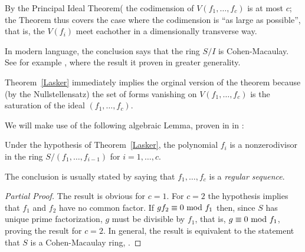 \documentclass[12pt, leqno]{book}
\begin{document}
By the Principal Ideal Theorem(\cite[Theorem ***]{Eisenbud95} the codimension of $V(f_{1},\dots, f_{c})$ is at most $c$;
the Theorem thus covers the case where the codimension is ``as large as possible'', that is, the $V(f_{i})$ meet eachother
in a dimensionally transverse way.

In modern language, the conclusion says that the ring $S/I$ is Cohen-Macaulay. See for example \cite[Chapter 18]{Eisenbud95}, where the result it proven in greater generality.

Theorem~\ref{Lasker} immediately implies the orginal version of the theorem because (by the Nullstellensatz) the set of forms vanishing on $V(f_{1}, \dots, f_{c})$ is the saturation 
of the ideal $(f_{1}, \dots, f_{c})$. 

We will make use of the following algebraic Lemma, proven in  in \cite[Theorem 18.***]{Eisenbud95}:

\begin{lemma}\label{Cohen-Macaulay}
 Under the hypothesis of Theorem~\ref{Lasker}, the polynomial $f_{i}$ is a nonzerodivisor in the ring 
$S/(f_{1}, \dots, f_{i-1})$ for $i = 1, \dots, c$.
\end{lemma}

The conclusion is usually stated by saying that   $f_{1}, \dots, f_{c}$ is a \emph{regular sequence}.

\begin{proof}[Partial Proof]
 The result is obvious for $c=1$. For $c=2$ the hypothesis implies that $f_{1}$ and $f_{2}$ have no common factor.
If $g f_{2} \equiv 0\ {\rm mod}\ f_{1}$ then, since $S$ has unique prime factorization, $g$ must be divisible by
$f_{1}$, that is, $g  \equiv 0\ {\rm mod}\ f_{1}$, proving the result for $c=2$. In general, the result is equivalent to the 
statement that $S$ is a Cohen-Macaulay ring,  \cite[Proposition 18.9]{Eisenbud95}.
\end{proof}
\end{document}
